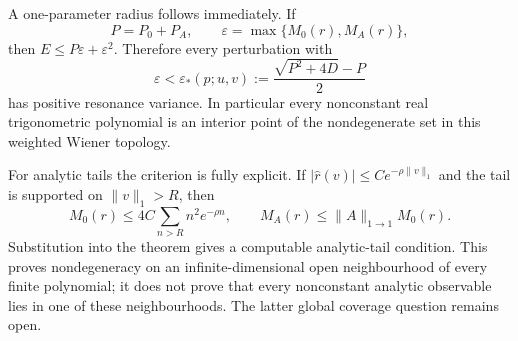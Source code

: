 A one-parameter radius follows immediately.  If
\[
 P=P_0+P_A,
 \qquad \varepsilon=\max\{M_0(r),M_A(r)\},
\]
then $E\leq P\varepsilon+\varepsilon^2$.  Therefore every perturbation with
\begin{equation}\label{eq:wiener-radius}
 \varepsilon<\varepsilon_*(p;u,v)
 :=\frac{\sqrt{P^2+4D}-P}{2}
\end{equation}
has positive resonance variance.  In particular every nonconstant real
trigonometric polynomial is an interior point of the nondegenerate set in
this weighted Wiener topology.

For analytic tails the criterion is fully explicit.  If
$|\widehat r(v)|\leq C e^{-\rho\|v\|_1}$ and the tail is supported on
$\|v\|_1>R$, then
\[
 M_0(r)\leq4C\sum_{n>R}n^2e^{-\rho n},
 \qquad M_A(r)\leq\|A\|_{1\to1}M_0(r).
 \tag{W.3}\label{eq:wiener-analytic-tail}
\]
Substitution into the theorem gives a computable analytic-tail condition.
This proves nondegeneracy on an infinite-dimensional open neighbourhood of
every finite polynomial; it does not prove that every nonconstant analytic
observable lies in one of these neighbourhoods.  The latter global coverage
question remains open.
